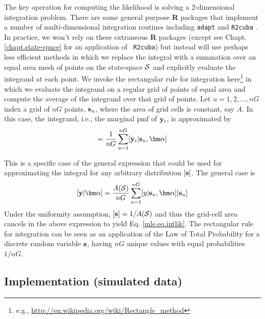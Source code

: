 The key operation for computing the likelihood is solving a
2-dimensional integration problem. There are some general purpose {\bf
  R} packages that implement a number of multi-dimensional integration
routines including \mbox{\tt adapt} \citep{genz_etal:2007} and
\mbox{\tt R2cuba} \citep{hahn_etal:2011}.  In practice, we won't rely
on these extraneous {\bf R} packages (except see
Chapt. \ref{chapt.state-space} for an application of \mbox{\tt
  R2cuba}) but instead will use perhaps less efficient methods in
which we replace the integral with a summation over an equal area mesh
of points on the state-space ${\cal S}$ and explicitly evaluate the
integrand at each point. We invoke the rectangular rule for
integration here\footnote{e.g.,
  \url{http://en.wikipedia.org/wiki/Rectangle_method} } in which we
evaluate the integrand on a regular grid of points of equal area and
compute the average of the integrand over that grid of points.  Let
$u=1,2,\ldots,nG$ index a grid of $nG$ points, ${\bf s}_{u}$, where
the area of grid cells is constant, say $A$.  In this case, the
integrand, i.e., the marginal pmf of ${\bf y}_{i}$, is approximated by
\begin{equation}
         [{\bf y}_{i}|{\bm \alpha}] = \frac{1}{nG} \sum_{u=1}^{nG}  [ {\bf
            y}_{i} |{\bf s}_u, {\bm \alpha}]
\label{mle.eq.intlik}
\end{equation}

This is a specific case of the general expression that could be used
for approximating the integral for any arbitrary 
distribution $[{\bf s}]$. The general case is
\[
[{\bf y}|{\bm \alpha}]  = \frac{A({\cal S})}{nG} \sum_{u=1}^{nG} [y|{\bf s}_{u},{\bm \alpha}] [{\bf s}_{u}]
\]
Under the uniformity assumption, $[{\bf s}] = 1/A({\cal S})$ and thus
the grid-cell area cancels in the above expression to yield
Eq. \ref{mle.eq.intlik}.  The rectangular rule for integration can be
seen as an application of the Law of Total Probability for a discrete
random variable ${\bf s}$, having $nG$ unique values with equal
probabilities $1/nG$.


\subsection{Implementation (simulated data)}

